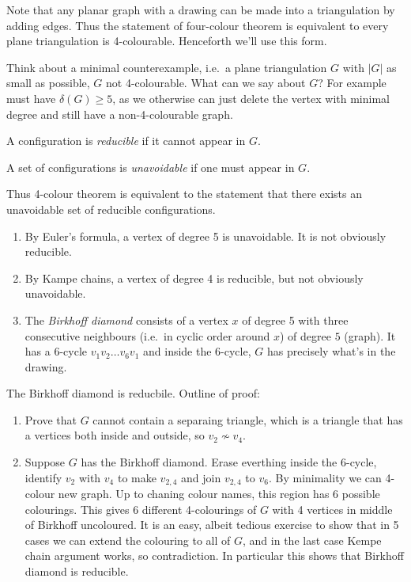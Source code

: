 \documentclass[a4paper]{article}
\begin{document}
Note that any planar graph with a drawing can be made into a triangulation by adding edges. Thus the statement of four-colour theorem is equivalent to every plane triangulation is 4-colourable. Henceforth we'll use this form.

Think about a minimal counterexample, i.e.\ a plane triangulation \(G\) with \(|G|\) as small as possible, \(G\) not 4-colourable. What can we say about \(G\)? For example must have \(\delta(G) \geq 5\), as we otherwise can just delete the vertex with minimal degree and still have a non-4-colourable graph.

\begin{definition}
  A configuration is \emph{reducible} if it cannot appear in \(G\).

  A set of configurations is \emph{unavoidable} if one must appear in \(G\).
\end{definition}

Thus 4-colour theorem is equivalent to the statement that there exists an unavoidable set of reducible configurations.

\begin{eg}\leavevmode
  \begin{enumerate}
  \item By Euler's formula, a vertex of degree 5 is unavoidable. It is not obviously reducible.
  \item By Kampe chains, a vertex of degree 4 is reducible, but not obviously unavoidable.
  \item The \emph{Birkhoff diamond} consists of a vertex \(x\) of degree 5 with three consecutive neighbours (i.e.\ in cyclic order around \(x\)) of degree \(5\) (graph). It has a 6-cycle \(v_1v_2 \dots v_6v_1\) and inside the 6-cycle, \(G\) has precisely what's in the drawing.
  \end{enumerate}
\end{eg}

\begin{ex}
  The Birkhoff diamond is reducbile. Outline of proof:
  \begin{enumerate}
  \item Prove that \(G\) cannot contain a separaing triangle, which is a triangle that has a vertices both inside and outside, so \(v_2 \nsim v_4\).
  \item Suppose \(G\) has the Birkhoff diamond. Erase everthing inside the 6-cycle, identify \(v_2\) with \(v_4\) to make \(v_{2, 4}\) and join \(v_{2, 4}\) to \(v_6\). By minimality we can 4-colour new graph. Up to chaning colour names, this region has 6 possible colourings. This gives 6 different 4-colourings of \(G\) with 4 vertices in middle of Birkhoff uncoloured. It is an easy, albeit tedious exercise to show that in 5 cases we can extend the colouring to all of \(G\), and in the last case Kempe chain argument works, so contradiction. In particular this shows that Birkhoff diamond is reducible.
  \end{enumerate}
\end{ex}
\end{document}
